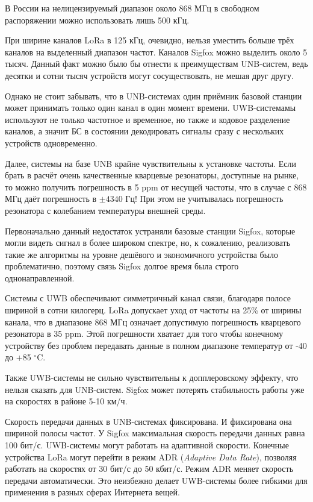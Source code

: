 В России на нелицензируемый диапазон около 868 МГц в свободном распоряжении 
можно использовать лишь 500 кГц.

При ширине каналов LoRa в 125 кГц, очевидно, нельзя уместить больше трёх 
каналов на выделенный диапазон частот. Каналов Sigfox можно выделить около 5 
тысяч. 
Данный факт можно было бы отнести к преимуществам UNB-систем, ведь десятки и 
сотни тысяч устройств могут сосуществовать, не мешая друг другу.

Однако не стоит забывать, что в UNB-системах один приёмник базовой станции 
может принимать только один канал в один момент времени. 
UWB-системамы используют не только частотное и временное, 
но также и кодовое разделение каналов, а значит БС в состоянии декодировать 
сигналы сразу с нескольких устройств одновременно.

Далее, системы на базе UNB крайне чувствительны к установке частоты. 
Если брать в расчёт очень качественные кварцевые резонаторы, доступные на 
рынке, то можно получить погрешность в 5 ppm от несущей частоты, что в случае с 
868 МГц даёт погрешность в $\pm 4340$ Гц! При этом не учитывалась погрешность 
резонатора с колебанием температуры внешней среды. 

Первоначально данный недостаток устраняли базовые станции Sigfox, которые могли 
видеть сигнал в более широком спектре, но, к сожалению, реализовать такие же 
алгоритмы на уровне дешёвого и экономичного устройства было проблематично, 
поэтому связь Sigfox долгое время была строго однонаправленной.

Системы с UWB обеспечивают симметричный канал связи, благодаря полосе шириной в 
сотни килогерц.
LoRa допускает уход от частоты на 25\% от ширины канала, что в диапазоне 868 
МГц означает допустимую погрешность кварцевого резонатора в 35 ppm. Этой 
погрешности хватает для того чтобы конечному устройству без проблем передавать 
данные в полном диапазоне температур от -40 до +85 $^\circ$C.

Также UWB-системы не сильно чувствительны к допплеровскому эффекту, что нельзя 
сказать для UNB-систем. 
Sigfox может потерять стабильность работы уже на скоростях в районе 5-10 км/ч.

Скорость передачи данных в UNB-системах фиксирована. И фиксирована она шириной 
полосы частот.
У Sigfox максимальная скорость передачи данных равна 100 бит/с.
UWB-системы могут работать на адаптивной скорости. 
Конечные устройства LoRa могут перейти в режим ADR (\textit{Adaptive Data 
Rate}), позволяя работать на скоростях от 30 бит/с до 50 кбит/с.
Режим ADR меняет скорость передачи автоматически.
Это неизбежно делает UWB-системы более гибкими для применения в разных сферах 
Интернета вещей.

